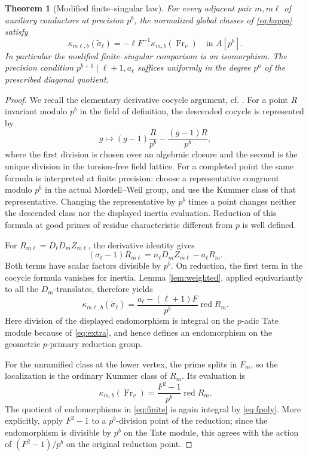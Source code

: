 \documentclass[11pt]{article}
\newtheorem{theorem}{Theorem}[section]
\theoremstyle{definition}\newtheorem{definition}[theorem]{Definition}
\theoremstyle{remark}\newtheorem{remark}[theorem]{Remark}
\newcommand{\red}{\operatorname{red}}\newcommand{\ord}{\operatorname{ord}}
\newcommand{\Frob}{\operatorname{Fr}}\newcommand{\HH}{\mathrm H}
\begin{document}
\begin{theorem}[Modified finite--singular law]\label{thm:descent}
For every adjacent pair $m,m\ell$ of auxiliary conductors at precision $p^b$, the normalized global classes of \eqref{eq:kappa} satisfy
\begin{equation}\label{eq:fs}
 \kappa_{m\ell,b}(\widetilde\sigma_\ell)
 =-\ell F^{-1}\kappa_{m,b}(\Frob_v)
 \quad\text{in }A[p^b].
\end{equation}
In particular the modified finite--singular comparison is an isomorphism. The precision condition $p^{b+1}\mid\ell+1,a_\ell$ suffices uniformly in the degree $p^a$ of the prescribed diagonal quotient.
\end{theorem}
\begin{proof}
We recall the elementary derivative cocycle argument, cf. \cite[Lemma 1.7.2 and Prop.~1.7.4]{Howard}. For a point $R$ invariant modulo $p^b$ in the field of definition, the descended cocycle is represented by
\[
 g\longmapsto (g-1)\frac{R}{p^b}-\frac{(g-1)R}{p^b},
\]
where the first division is chosen over an algebraic closure and the second is the unique division in the torsion-free field lattice. For a completed point the same formula is interpreted at finite precision: choose a representative congruent modulo $p^b$ in the actual Mordell--Weil group, and use the Kummer class of that representative. Changing the representative by $p^b$ times a point changes neither the descended class nor the displayed inertia evaluation. Reduction of this formula at good primes of residue characteristic different from $p$ is well defined.

For $R_{m\ell}=D_\ell D_m Z_{m\ell}$, the derivative identity gives
\[
 (\sigma_\ell-1)R_{m\ell}
 =n_\ell D_mZ_{m\ell}-a_\ell R_m.
\]
Both terms have scalar factors divisible by $p^b$. On reduction, the first term in the cocycle formula vanishes for inertia. Lemma \ref{lem:weighted}, applied equivariantly to all the $D_m$-translates, therefore yields
\begin{equation}\label{eq:sing}
 \kappa_{m\ell,b}(\widetilde\sigma_\ell)
 =\frac{a_\ell-(\ell+1)F}{p^b}\red R_m.
\end{equation}
Here division of the displayed endomorphism is integral on the $p$-adic Tate module because of \eqref{eq:extra}, and hence defines an endomorphism on the geometric $p$-primary reduction group.

For the unramified class at the lower vertex, the prime splits in $F_m$, so the localization is the ordinary Kummer class of $R_m$. Its evaluation is
\begin{equation}\label{eq:finite}
 \kappa_{m,b}(\Frob_v)=\frac{F^2-1}{p^b}\red R_m.
\end{equation}
The quotient of endomorphisms in \eqref{eq:finite} is again integral by \eqref{eq:fpoly}. More explicitly, apply $F^2-1$ to a $p^b$-division point of the reduction; since the endomorphism is divisible by $p^b$ on the Tate module, this agrees with the action of $(F^2-1)/p^b$ on the original reduction point.


\end{proof}
\end{document}
